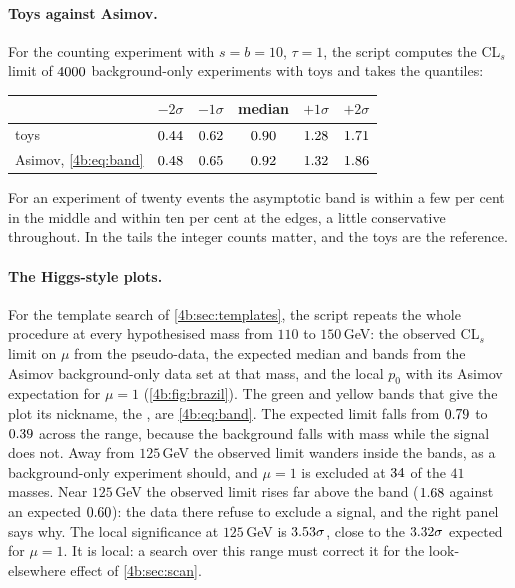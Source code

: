 \paragraph{Toys against Asimov.}
For the counting experiment with $s=b=10$, $\tau=1$, the script computes the CL$_s$ limit
of $4000$ background-only experiments with toys and takes the quantiles:
\begin{center}
\begin{tabular}{lccccc}
\toprule
 & $-2\sigma$ & $-1\sigma$ & median & $+1\sigma$ & $+2\sigma$\\
\midrule
toys & $0.44$ & $0.62$ & $0.90$ & $1.28$ & $1.71$\\
Asimov, \eqref{4b:eq:band} & $0.48$ & $0.65$ & $0.92$ & $1.32$ & $1.86$\\
\bottomrule
\end{tabular}
\end{center}
For an experiment of twenty events the asymptotic band is within a few per cent in the
middle and within ten per cent at the edges, a little conservative throughout. In
the tails the integer counts matter, and the toys are the reference.

\paragraph{The Higgs-style plots.}
For the template search of \cref{4b:sec:templates}, the script repeats the whole
procedure at every hypothesised mass from $110$ to $150\,$GeV: the observed CL$_s$
limit on $\mu$ from the pseudo-data, the expected median and bands from the Asimov
background-only data set at that mass, and the local $p_0$ with its Asimov expectation
for $\mu=1$ (\cref{4b:fig:brazil}). The green and yellow bands that give the plot its
nickname, the , are \eqref{4b:eq:band}. The expected limit falls
from $0.79$ to $0.39$ across the range, because the background
falls with mass while the signal does not. Away from $125\,$GeV the observed limit
wanders inside the bands, as a background-only experiment should, and $\mu=1$ is
excluded at $34$ of the $41$ masses. Near $125\,$GeV the observed limit rises far
above the band ($1.68$ against an expected $0.60$):
the data there refuse to exclude a signal, and the right panel says why. The local
significance at $125\,$GeV is $3.53\sigma$, close to the
$3.32\sigma$ expected for $\mu=1$. It is local: a search over this
range must correct it for the look-elsewhere effect of \cref{4b:sec:scan}.

